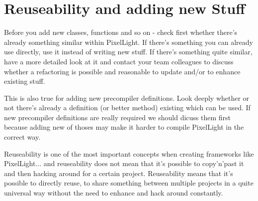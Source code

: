 \section{Reuseability and adding new Stuff}
Before you add new classes, functions and so on - check first whether there's already something similar within PixelLight. If there's something you can already use directly, use it instead of writing new stuff. If there's something quite similar, have a more detailed look at it and contact your team colleagues to discuss whether a refactoring is possible and reasonable to update and/or to enhance existing stuff.

This is also true for adding new precompiler definitions. Look deeply whether or not there's already a definition (or better method) existing which can be used. If new precompiler definitions are really required we should dicuss them first because adding new of thoses may make it harder to compile PixelLight in the correct way.

Reuseability is one of the most important concepts when creating frameworks like PixelLight... and reuseability does not mean that it's possible to copy'n'past it and then hacking around for a certain project. Reuseability means that it's possible to directly reuse, to share something between multiple projects in a quite universal way without the need to enhance and hack around constantly.
